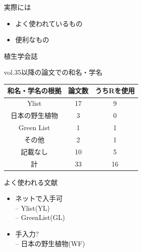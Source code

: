 \documentclass[
  a5paper,
  landscape,
  notitlepage]{report}
\providecommand{\tightlist}{%
  \setlength{\itemsep}{0pt}\setlength{\parskip}{0pt}}
\begin{document}
\begin{center}
実際には
\end{center}

\begin{itemize}
\tightlist
\item
  よく使われているもの\\
\item
  便利なもの
\end{itemize}

\newpage

\fontsize{32pt}{32pt}\selectfont

\begin{center}
植生学会誌   

\fontsize{22pt}{22pt}\selectfont
vol.35以降の論文での和名・学名   

\end{center}

\fontsize{28pt}{28pt}\selectfont
\vspace{20pt}

\begin{longtable}[]{@{}ccc@{}}
\toprule
和名・学名の根拠 & 論文数 & うちRを使用 \\
\midrule
\endhead
Ylist & 17 & 9 \\
日本の野生植物 & 3 & 0 \\
Green List & 1 & 1 \\
その他 & 2 & 1 \\
記載なし & 10 & 5 \\
計 & 33 & 16 \\
\bottomrule
\end{longtable}

\newpage

\fontsize{32pt}{32pt}\selectfont

\begin{center}
よく使われる文献
\end{center}

\begin{itemize}
\tightlist
\item
  ネットで入手可\\
  -- Ylist(YL)\\
  -- GreenList(GL)\\
\item
  手入力?\\
  -- 日本の野生植物(WF)
\end{itemize}

\begin{center}
\downarrow   
\end{center}
\end{document}
